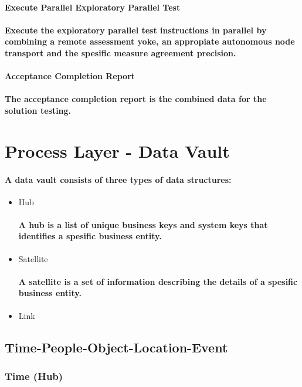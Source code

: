 \paragraph{Execute Parallel Exploratory Parallel Test}
\paragraph{Execute the exploratory parallel test instructions in parallel by combining a remote assessment yoke, an appropiate autonomous node transport and the spesific measure agreement precision.}
\paragraph{Acceptance Completion Report}
\paragraph{The acceptance completion report is the combined data for the solution testing.}
\pagebreak
\section{Process Layer - Data Vault}
\paragraph{A data vault consists of three types of data structures:}
\begin{itemize}
\item{Hub}
\paragraph{A hub is a list of unique business keys and system keys that identifies a spesific business entity.}
\item{Satellite}
\paragraph{A satellite is a set of information describing the details of a spesific business entity.}
\item{Link}
\end{itemize}
\subsection{Time-People-Object-Location-Event}
\subsubsection{Time (Hub)}
